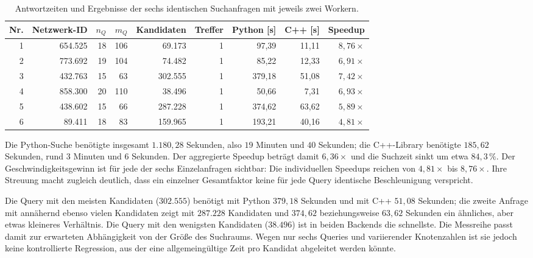 \documentclass[a4paper,12pt, twoside]{report}
\theoremstyle{definition}
\begin{document}
\begin{table}[!htbp]
	\centering
	\small
	\caption{Antwortzeiten und Ergebnisse der sechs identischen Suchanfragen mit jeweils zwei Workern.}
	\label{tab:backend_queries}
	\begin{tabular}{@{}rrrrrrrrr@{}}
		\toprule
		Nr. & Netzwerk-ID & $n_Q$ & $m_Q$ & Kandidaten & Treffer & Python [s] & C++ [s] & Speedup \\
		\midrule
		1 & 654.525 & 18 & 106 & 69.173 & 1 & 97{,}39 & 11{,}11 & $8{,}76\times$ \\
		2 & 773.692 & 19 & 104 & 74.482 & 1 & 85{,}22 & 12{,}33 & $6{,}91\times$ \\
		3 & 432.763 & 15 &  63 & 302.555 & 1 & 379{,}18 & 51{,}08 & $7{,}42\times$ \\
		4 & 858.300 & 20 & 110 & 38.496 & 1 & 50{,}66 & 7{,}31 & $6{,}93\times$ \\
		5 & 438.602 & 15 &  66 & 287.228 & 1 & 374{,}62 & 63{,}62 & $5{,}89\times$ \\
		6 & 89.411 & 18 &  83 & 159.965 & 1 & 193{,}21 & 40{,}16 & $4{,}81\times$ \\
		\bottomrule
	\end{tabular}
\end{table}

Die Python-Suche benötigte insgesamt $1.180{,}28$ Sekunden, also $19$ Minuten und $40$ Sekunden; die C++-Library benötigte $185{,}62$ Sekunden, rund $3$ Minuten und $6$ Sekunden. Der aggregierte Speedup beträgt damit $6{,}36\times$ und die Suchzeit sinkt um etwa $84{,}3\,\%$. Der Geschwindigkeitsgewinn ist für jede der sechs Einzelanfragen sichtbar: Die individuellen Speedups reichen von $4{,}81\times$ bis $8{,}76\times$. Ihre Streuung macht zugleich deutlich, dass ein einzelner Gesamtfaktor keine für jede Query identische Beschleunigung verspricht.

Die Query mit den meisten Kandidaten ($302.555$) benötigt mit Python $379{,}18$ Sekunden und mit C++ $51{,}08$ Sekunden; die zweite Anfrage mit annähernd ebenso vielen Kandidaten zeigt mit $287.228$ Kandidaten und $374{,}62$ beziehungsweise $63{,}62$ Sekunden ein ähnliches, aber etwas kleineres Verhältnis. Die Query mit den wenigsten Kandidaten ($38.496$) ist in beiden Backends die schnellste. Die Messreihe passt damit zur erwarteten Abhängigkeit von der Größe des Suchraums. Wegen nur sechs Queries und variierender Knotenzahlen ist sie jedoch keine kontrollierte Regression, aus der eine allgemeingültige Zeit pro Kandidat abgeleitet werden könnte.
\end{document}
